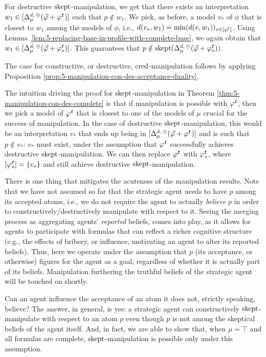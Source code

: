 \begin{prf*}{}{}
	For destructive ${\operatorname{skept}}$-manipulation, 
	we get that there exists an interpretation 
	$w_1\in[\Delta^{d,\:{\operatorname{\oplus}}}_{\mu}({\vec{\varphi}}+{\varphi}^{\mathtt{f}})]$
	such that $p\notin w_1$. We pick, as before, a model $v_\ast$ of 
	$\phi$ that is closest to $w_1$ among the models of $\phi$, 
	i.e., $d(v_\ast,w_1)={\operatorname{min}}(d(v,w_1))_{v\in[{\varphi}^{\mathtt{f}}]}$.
	Using Lemma~\ref{lem:5-replacing-base-in-profile-with-complete-base}, 
	we again obtain that $w_1\in[\Delta^{d,\:{\operatorname{\oplus}}}_{\mu}({\vec{\varphi}}+{\varphi}^{\mathtt{f}}_\ast)]$.
	This guarantees that $p\notin{\operatorname{skept}}(\Delta^{d,\:{\operatorname{\oplus}}}_{\mu}({\vec{\varphi}}+{\varphi}^{\mathtt{f}}_\ast))$.
	
	The case for constructive, or destructive, ${\operatorname{cred}}$-manipulation follows 
	by applying Proposition \ref{prop:5-manipulation-con-des-acceptance-duality}.
\end{prf*}

The intuition driving the proof for ${\operatorname{skept}}$-manipulation in Theorem \ref{thm:5-manipulation-con-des-complete}
is that
if manipulation is possible with ${\varphi}^{\mathtt{f}}$,
then we pick a model of ${\varphi}^{\mathtt{f}}$ that is closest to one of the models of 
$\mu$ crucial for the success of manipulation.
In the case of destructive ${\operatorname{skept}}$-manipulation, this would be an interpretation $v_\ast$
that ends up being in 
$[\Delta_\mu^{d,\:{\operatorname{\oplus}}}({\vec{\varphi}}+{\varphi}^{\mathtt{f}})]$ and is such that $p\notin v_\ast$:
$v_\ast$ must exist, under the assumption that 
${\varphi}^{\mathtt{f}}$ successfully achieves destructive ${\operatorname{skept}}$-manipulation.
We can then replace ${\varphi}^{\mathtt{f}}$ with 
${\varphi}^{\mathtt{f}}_\ast$, where $[{\varphi}^{\mathtt{f}}_\ast]=\{{v_\ast}\}$ and still achieve
destructive ${\operatorname{skept}}$-manipulation.

There is one thing that mitigates the acuteness of the manipulation results.
Note that we have not assumed so far that the strategic agent needs to have $p$ among its accepted atoms, i.e., 
we do not require the agent to actually \emph{believe} 
$p$ in order to constructively/destructively manipulate with respect to it.
Seeing the merging process as aggregating agents' \emph{reported} beliefs,
comes into play, as it allows for agents to participate with formulas that can reflect a richer cognitive
structure (e.g., the effects of bribery, or influence, motivating an agent to alter its reported beliefs).
Thus, here we operate under the assumption that $p$ (its acceptance, or otherwise) figures for the agent 
as a goal, regardless of whether it is actually part of its beliefs.
Manipulation furthering the truthful beliefs of the strategic agent 
will be touched on shortly.

Can an agent influence the acceptance of an atom it does not, strictly speaking, believe?
The answer, in general, is yes:
a strategic agent can constructively ${\operatorname{skept}}$-manipulate 
with respect to an atom $p$ even though 
$p$ is not among the skeptical beliefs of the agent itself. 
And, in fact, we are able to show that, 
when $\mu=\top$ and all formulas are complete, 
${\operatorname{skept}}$-manipulation is possible only under this assumption.

